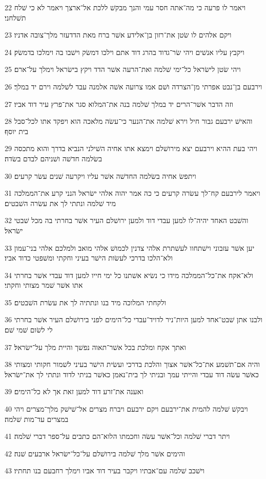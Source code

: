 \par 22 ויאמר לו פרעה כי מה־אתה חסר עמי והנך מבקשׁ ללכת אל־ארצך ויאמר לא כי שׁלח תשׁלחני׃
\par 23 ויקם אלהים לו שׂטן את־רזון בן־אלידע אשׁר ברח מאת הדדעזר מלך־צובה אדניו׃
\par 24 ויקבץ עליו אנשׁים ויהי שׂר־גדוד בהרג דוד אתם וילכו דמשׂק וישׁבו בה וימלכו בדמשׂק׃
\par 25 ויהי שׂטן לישׂראל כל־ימי שׁלמה ואת־הרעה אשׁר הדד ויקץ בישׂראל וימלך על־ארם׃
\par 26 וירבעם בן־נבט אפרתי מן־הצרדה ושׁם אמו צרועה אשׁה אלמנה עבד לשׁלמה וירם יד במלך׃
\par 27 וזה הדבר אשׁר־הרים יד במלך שׁלמה בנה את־המלוא סגר את־פרץ עיר דוד אביו׃
\par 28 והאישׁ ירבעם גבור חיל וירא שׁלמה את־הנער כי־עשׂה מלאכה הוא ויפקד אתו לכל־סבל בית יוסף׃
\par 29 ויהי בעת ההיא וירבעם יצא מירושׁלם וימצא אתו אחיה השׁילני הנביא בדרך והוא מתכסה בשׂלמה חדשׁה ושׁניהם לבדם בשׂדה׃
\par 30 ויתפשׂ אחיה בשׂלמה החדשׁה אשׁר עליו ויקרעה שׁנים עשׂר קרעים׃
\par 31 ויאמר לירבעם קח־לך עשׂרה קרעים כי כה אמר יהוה אלהי ישׂראל הנני קרע את־הממלכה מיד שׁלמה ונתתי לך את עשׂרה השׁבטים׃
\par 32 והשׁבט האחד יהיה־לו למען עבדי דוד ולמען ירושׁלם העיר אשׁר בחרתי בה מכל שׁבטי ישׂראל׃
\par 33 יען אשׁר עזבוני וישׁתחוו לעשׁתרת אלהי צדנין לכמושׁ אלהי מואב ולמלכם אלהי בני־עמון ולא־הלכו בדרכי לעשׂות הישׁר בעיני וחקתי ומשׁפטי כדוד אביו׃
\par 34 ולא־אקח את־כל־הממלכה מידו כי נשׂיא אשׁתנו כל ימי חייו למען דוד עבדי אשׁר בחרתי אתו אשׁר שׁמר מצותי וחקתי׃
\par 35 ולקחתי המלוכה מיד בנו ונתתיה לך את עשׂרת השׁבטים׃
\par 36 ולבנו אתן שׁבט־אחד למען היות־ניר לדויד־עבדי כל־הימים לפני בירושׁלם העיר אשׁר בחרתי לי לשׂום שׁמי שׁם׃
\par 37 ואתך אקח ומלכת בכל אשׁר־תאוה נפשׁך והיית מלך על־ישׂראל׃
\par 38 והיה אם־תשׁמע את־כל־אשׁר אצוך והלכת בדרכי ועשׂית הישׁר בעיני לשׁמור חקותי ומצותי כאשׁר עשׂה דוד עבדי והייתי עמך ובניתי לך בית־נאמן כאשׁר בניתי לדוד ונתתי לך את־ישׂראל׃
\par 39 ואענה את־זרע דוד למען זאת אך לא כל־הימים׃
\par 40 ויבקשׁ שׁלמה להמית את־ירבעם ויקם ירבעם ויברח מצרים אל־שׁישׁק מלך־מצרים ויהי במצרים עד־מות שׁלמה׃
\par 41 ויתר דברי שׁלמה וכל־אשׁר עשׂה וחכמתו הלוא־הם כתבים על־ספר דברי שׁלמה׃
\par 42 והימים אשׁר מלך שׁלמה בירושׁלם על־כל־ישׂראל ארבעים שׁנה׃
\par 43 וישׁכב שׁלמה עם־אבתיו ויקבר בעיר דוד אביו וימלך רחבעם בנו תחתיו׃

